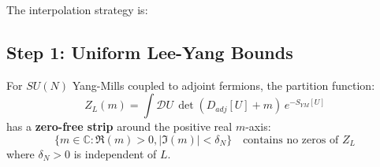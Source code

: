 The interpolation strategy is:
\begin{center}
\end{center}

\subsection{Step 1: Uniform Lee-Yang Bounds}
\label{subsec:roadmap3-step1}

\begin{theorem}
\label{thm:lee-yang-strip}
For $SU(N)$ Yang-Mills coupled to adjoint fermions, the partition function:
\[
Z_L(m) = \int \mathcal{D}U \, \det(D_{adj}[U] + m) \, e^{-S_{YM}[U]}
\]
has a \textbf{zero-free strip} around the positive real $m$-axis:
\[
\{m \in \mathbb{C} : \Re(m) > 0, |\Im(m)| < \delta_N\} \quad \text{contains no zeros of } Z_L
\]
where $\delta_N > 0$ is independent of $L$.
\end{theorem}

